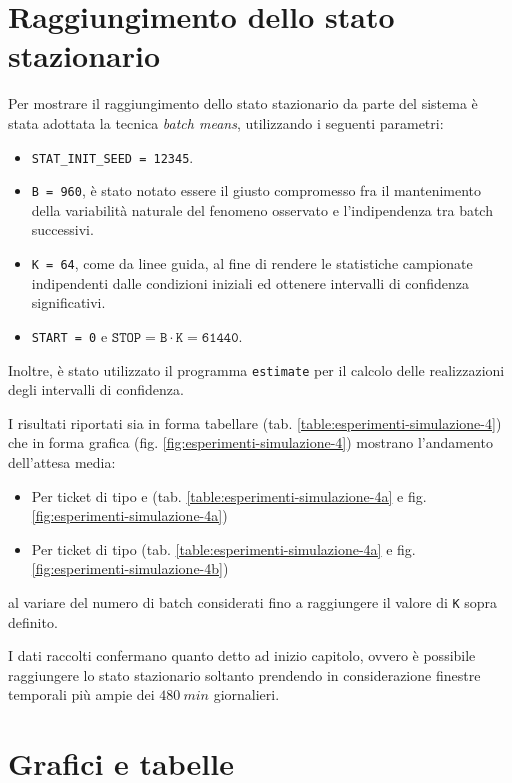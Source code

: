 \section{Raggiungimento dello stato stazionario}\label{sec:esperimenti-simulazione-stazionario}
Per mostrare il raggiungimento dello stato stazionario da parte del sistema è stata adottata la tecnica \textit{batch means}, utilizzando i seguenti parametri:
\begin{itemize}
\item \texttt{STAT\_INIT\_SEED = 12345}.
\item \texttt{B = 960}, è stato notato essere il giusto compromesso fra il mantenimento della variabilità naturale del fenomeno osservato e l'indipendenza tra batch successivi.
\item \texttt{K = 64}, come da linee guida, al fine di rendere le statistiche campionate indipendenti dalle condizioni iniziali ed ottenere intervalli di confidenza significativi.
\item \texttt{START = 0} e $\mathtt{STOP = B \cdot K = 61440}$.
\end{itemize}

Inoltre, è stato utilizzato il programma \texttt{estimate} per il calcolo delle realizzazioni degli intervalli di confidenza.

I risultati riportati sia in forma tabellare (tab. \ref{table:esperimenti-simulazione-4}) che in forma grafica (fig. \ref{fig:esperimenti-simulazione-4}) mostrano l'andamento dell'attesa media:
\begin{itemize}
\item Per ticket di tipo \uo{} e \pp{} (tab. \ref{table:esperimenti-simulazione-4a} e fig. \ref{fig:esperimenti-simulazione-4a})
\item Per ticket di tipo \sr{} (tab. \ref{table:esperimenti-simulazione-4a} e fig. \ref{fig:esperimenti-simulazione-4b})
\end{itemize}
al variare del numero di batch considerati fino a raggiungere il valore di \texttt{K} sopra definito.

I dati raccolti confermano quanto detto ad inizio capitolo, ovvero è possibile raggiungere lo stato stazionario soltanto prendendo in considerazione finestre temporali più ampie dei $480\ min$ giornalieri.

\newpage
\section{Grafici e tabelle}
